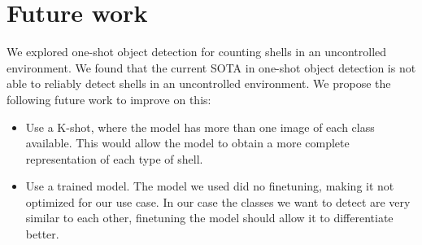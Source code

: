 \section{Future work}
We explored one-shot object detection for counting shells in an uncontrolled environment. We found that the current SOTA in one-shot object detection is not able to reliably detect shells in an uncontrolled environment. We propose the following future work to improve on this:
\begin{itemize}
    \item Use a K-shot, where the model has more than one image of each class available. This would allow the model to obtain a more complete representation of each type of shell.
    \item Use a trained model. The model we used did no finetuning, making it not optimized for our use case. In our case the classes we want to detect are very similar to each other, finetuning the model should allow it to differentiate better.
\end{itemize}